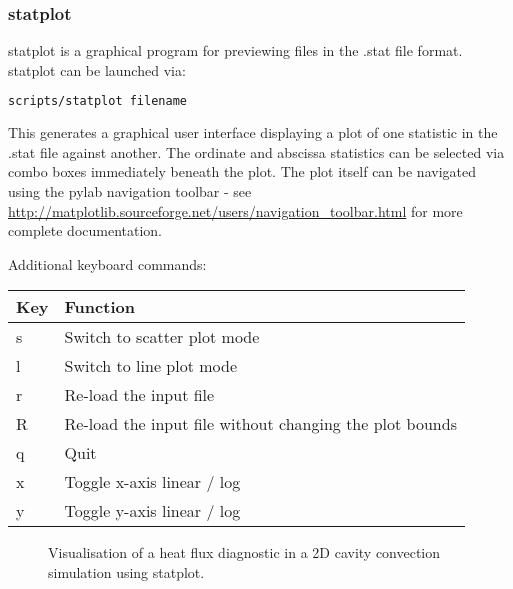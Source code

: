 
\subsubsection{statplot}
\label{sect:statplot}

statplot is a graphical program for previewing files in the .stat file format.
statplot can be launched via:

\begin{lstlisting}[language = Bash]
scripts/statplot filename
\end{lstlisting}

This generates a graphical user interface displaying a plot of one statistic in
the .stat file against another. The ordinate and abscissa statistics can be
selected via combo boxes immediately beneath the plot. The plot itself can
be navigated using the pylab navigation toolbar - see
\url{http://matplotlib.sourceforge.net/users/navigation_toolbar.html} for
more complete documentation.

Additional keyboard commands:

\begin{center}
  \begin{tabular}{| l | l |}
    \hline
    Key & Function \\
    \hline
    s   & Switch to scatter plot mode \\
    l   & Switch to line plot mode \\
    r   & Re-load the input file \\
    R   & Re-load the input file without changing the plot bounds \\
    q   & Quit \\
    x   & Toggle x-axis linear / log \\
    y   & Toggle y-axis linear / log \\
    \hline
  \end{tabular}
\end{center}

\begin{figure}[ht]
  \centering
  \caption{Visualisation of a heat flux diagnostic in a 2D cavity convection
           simulation using statplot.}
  \label{fig:statplot}
\end{figure}


